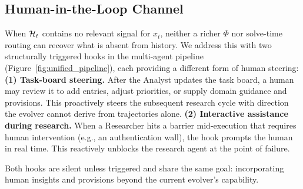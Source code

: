 \subsection{Human-in-the-Loop Channel}
\label{sec:method-hitl}

When $\mathcal{H}_t$ contains no relevant signal for $x_t$, neither a richer $\Phi$ nor solve-time routing can recover what is absent from history. We address this with two structurally triggered hooks in the multi-agent pipeline (Figure~\ref{fig:unified_pipeline}), each providing a different form of human steering:
\noindent\textbf{(1) Task-board steering.}
After the Analyst updates the task board, a human may review it to add entries, adjust priorities, or supply domain guidance and provisions. This proactively steers the subsequent research cycle with direction the evolver cannot derive from trajectories alone.
\noindent\textbf{(2) Interactive assistance during research.}
When a Researcher hits a barrier mid-execution that requires human intervention (e.g., an authentication wall), the hook prompts the human in real time. This reactively unblocks the research agent at the point of failure.

Both hooks are silent unless triggered and share the same goal: incorporating human insights and provisions beyond the current evolver's capability.
